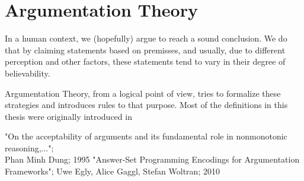 \documentclass[12pt]{report}
\theoremstyle{break}
\begin{document}
\section{Argumentation Theory}
\begin{flushleft}
In a human context, we (hopefully) argue to reach a sound conclusion. We do that by claiming statements based on premisses, and usually, due to different perception and other factors,
these statements tend to vary in their degree of believability.

Argumentation Theory, from a logical point of view, tries to formalize these strategies and introduces rules to that purpose. 
Most of the definitions in this thesis were originally introduced in \cite{Dung}
\end{flushleft}






\begin{thebibliography}{1}
	 "On the acceptability of arguments and its fundamental role in nonmonotonic reasoning,...";\\Phan Minh Dung; 1995
	 "Answer-Set Programming Encodings for Argumentation Frameworks"; Uwe Egly, Alice Gaggl, Stefan Woltran; 2010  
\end{thebibliography}
\end{document}
